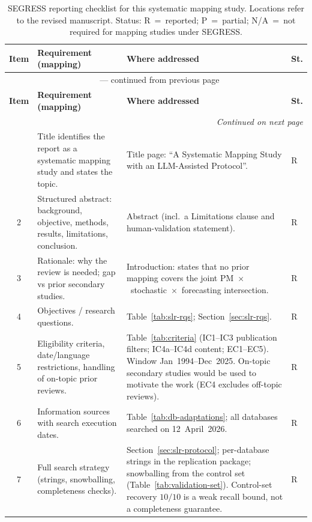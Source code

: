 
\begin{longtable}{c p{4.4cm} p{6.6cm} l}
\caption{SEGRESS reporting checklist for this systematic mapping study.
Locations refer to the revised manuscript. Status: R~=~reported;
P~=~partial; N/A~=~not required for mapping studies under SEGRESS.}
\label{tab:segress-checklist}\\
\toprule
\textbf{Item} & \textbf{Requirement (mapping)} & \textbf{Where addressed} & \textbf{St.} \\
\midrule
\endfirsthead
\multicolumn{4}{c}{\tablename\ \thetable{} --- continued from previous page}\\
\toprule
\textbf{Item} & \textbf{Requirement (mapping)} & \textbf{Where addressed} & \textbf{St.} \\
\midrule
\endhead
\midrule
\multicolumn{4}{r}{\emph{Continued on next page}}\\
\endfoot
\bottomrule
\endlastfoot
1 & Title identifies the report as a systematic mapping study and states the topic. & Title page: ``A Systematic Mapping Study with an LLM-Assisted Protocol''. & R \\
2 & Structured abstract: background, objective, methods, results, limitations, conclusion. & Abstract (incl.\ a Limitations clause and human-validation statement). & R \\
3 & Rationale: why the review is needed; gap vs prior secondary studies. & Introduction: states that no prior mapping covers the joint PM~$\times$~stochastic~$\times$~forecasting intersection. & R \\
4 & Objectives / research questions. & Table~\ref{tab:slr-rqs}; Section~\ref{sec:slr-rqs}. & R \\
5 & Eligibility criteria, date/language restrictions, handling of on-topic prior reviews. & Table~\ref{tab:criteria} (IC1--IC3 publication filters; IC4a--IC4d content; EC1--EC5). Window Jan~1994--Dec~2025. On-topic secondary studies would be used to motivate the work (EC4 excludes off-topic reviews). & R \\
6 & Information sources with search execution dates. & Table~\ref{tab:db-adaptations}; all databases searched on 12~April~2026. & R \\
7 & Full search strategy (strings, snowballing, completeness checks). & Section~\ref{sec:slr-protocol}; per-database strings in the replication package; snowballing from the control set (Table~\ref{tab:validation-set}). Control-set recovery $10/10$ is a weak recall bound, not a completeness guarantee. & R \\

\end{longtable}
